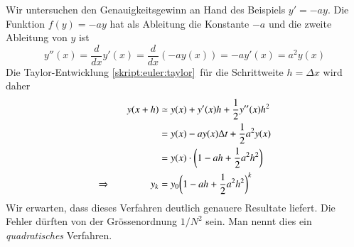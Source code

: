Wir untersuchen den Genauigkeitsgewinn an Hand des Beispiels $y'=-ay$.
Die Funktion $f(y) = -ay$ hat als Ableitung die Konstante $-a$ und
die zweite Ableitung von $y$ ist
\[
y''(x) = \frac{d}{dx} y'(x) = \frac{d}{dx} (-ay(x)) = -ay'(x)=a^2 y(x)
\]
Die Taylor-Entwicklung \eqref{skript:euler:taylor} für die Schrittweite
$h=\Delta x$ wird daher
\begin{align}
y(x+h)
&\simeq
y(x) + y'(x)h + \frac12y''(x)h^2
\notag
\\
&= y(x) - ay(x)\Delta t + \frac12 a^2 y(x)
\notag
\\
&= y(x)\cdot \biggl(1-ah+\frac12 a^2h^2\biggr)
\notag
\\
\Rightarrow\qquad\qquad
y_k&=y_0\biggl(1-ah+\frac12 a^2h^2\biggr)^k
\label{skript:euler:beschleunigt}
\end{align}
Wir erwarten, dass dieses Verfahren deutlich genauere Resultate liefert.
Die Fehler dürften von der Grössenordnung $1/N^2$ sein.
Man nennt dies ein {\em quadratisches} Verfahren.
%


